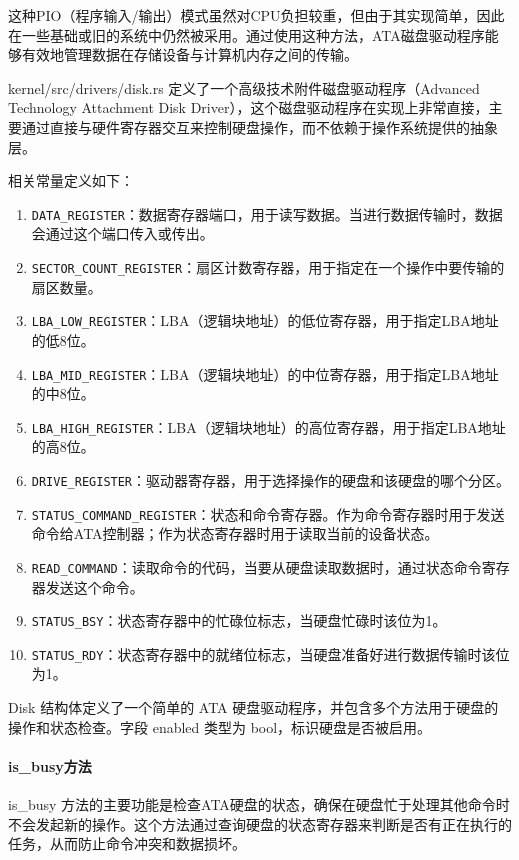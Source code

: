 这种PIO（程序输入/输出）模式虽然对CPU负担较重，但由于其实现简单，因此在一些基础或旧的系统中仍然被采用。通过使用这种方法，ATA磁盘驱动程序能够有效地管理数据在存储设备与计算机内存之间的传输。

kernel/src/drivers/disk.rs 定义了一个高级技术附件磁盘驱动程序（Advanced Technology Attachment Disk Driver），这个磁盘驱动程序在实现上非常直接，主要通过直接与硬件寄存器交互来控制硬盘操作，而不依赖于操作系统提供的抽象层。

相关常量定义如下：

\begin{enumerate}
    \item \texttt{DATA\_REGISTER}：数据寄存器端口，用于读写数据。当进行数据传输时，数据会通过这个端口传入或传出。
    \item \texttt{SECTOR\_COUNT\_REGISTER}：扇区计数寄存器，用于指定在一个操作中要传输的扇区数量。
    \item \texttt{LBA\_LOW\_REGISTER}：LBA（逻辑块地址）的低位寄存器，用于指定LBA地址的低8位。
    \item \texttt{LBA\_MID\_REGISTER}：LBA（逻辑块地址）的中位寄存器，用于指定LBA地址的中8位。
    \item \texttt{LBA\_HIGH\_REGISTER}：LBA（逻辑块地址）的高位寄存器，用于指定LBA地址的高8位。
    \item \texttt{DRIVE\_REGISTER}：驱动器寄存器，用于选择操作的硬盘和该硬盘的哪个分区。
    \item \texttt{STATUS\_COMMAND\_REGISTER}：状态和命令寄存器。作为命令寄存器时用于发送命令给ATA控制器；作为状态寄存器时用于读取当前的设备状态。
    \item \texttt{READ\_COMMAND}：读取命令的代码，当要从硬盘读取数据时，通过状态命令寄存器发送这个命令。
    \item \texttt{STATUS\_BSY}：状态寄存器中的忙碌位标志，当硬盘忙碌时该位为1。
    \item \texttt{STATUS\_RDY}：状态寄存器中的就绪位标志，当硬盘准备好进行数据传输时该位为1。
\end{enumerate}

Disk 结构体定义了一个简单的 ATA 硬盘驱动程序，并包含多个方法用于硬盘的操作和状态检查。字段 enabled 类型为 bool，标识硬盘是否被启用。

\paragraph{is\_busy方法}

is\_busy 方法的主要功能是检查ATA硬盘的状态，确保在硬盘忙于处理其他命令时不会发起新的操作。这个方法通过查询硬盘的状态寄存器来判断是否有正在执行的任务，从而防止命令冲突和数据损坏。

